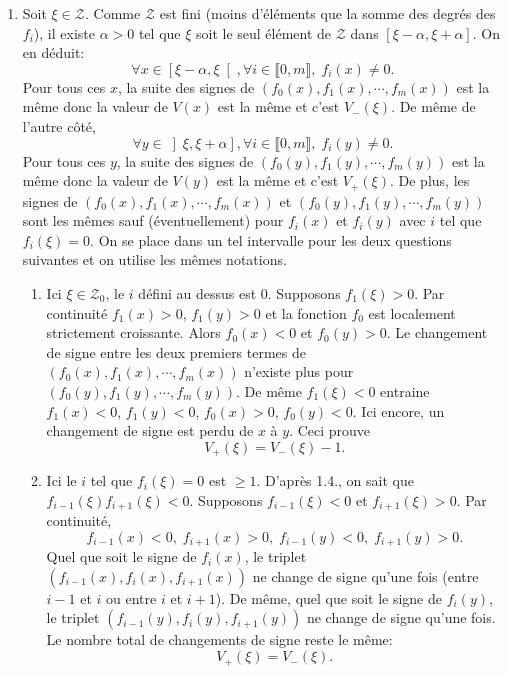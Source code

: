 \begin{enumerate}
  \item Soit $\xi \in \mathcal{Z}$. Comme $\mathcal{Z}$ est fini (moins d'éléments que la somme des degrés des $f_i$), il existe $\alpha > 0$ tel que $\xi$ soit le seul élément de $\mathcal{Z}$ dans $\left[ \xi - \alpha, \xi + \alpha \right]$. On en déduit:
  \[
    \forall x \in \left[ \xi - \alpha, \xi \right[, \forall i \in \llbracket 0, m \rrbracket, \; f_i(x) \neq 0.
  \]
Pour tous ces $x$, la suite des signes de $(f_0(x), f_1(x), \cdots, f_m(x))$ est la même donc la valeur de $V(x)$ est la même et c'est $V_-(\xi)$. De même de l'autre côté,
  \[
    \forall y \in \left] \xi , \xi + \alpha\right], \forall i \in \llbracket 0, m \rrbracket, \; f_i(y) \neq 0.
  \]
Pour tous ces $y$, la suite des signes de $(f_0(y), f_1(y), \cdots, f_m(y))$ est la même donc la valeur de $V(y)$ est la même et c'est $V_+(\xi)$.\newline
De plus, les signes de $(f_0(x), f_1(x), \cdots, f_m(x))$ et $(f_0(y), f_1(y), \cdots, f_m(y))$ sont les mêmes sauf (éventuellement) pour $f_i(x)$ et $f_i(y)$ avec $i$ tel que $f_i(\xi)= 0$.\newline
On se place dans un tel intervalle pour les deux questions suivantes et on utilise les mêmes notations.
  \begin{enumerate}
  \item Ici $\xi \in \mathcal{Z}_0$, le $i$ défini au dessus est $0$.\newline
  Supposons $f_1(\xi) > 0$. Par continuité $f_1(x)>0$, $f_1(y) >0$ et la fonction $f_0$ est localement strictement croissante. Alors $f_0(x) < 0$ et $f_0(y) >0$. Le changement de signe entre les deux premiers termes de $(f_0(x), f_1(x), \cdots, f_m(x))$ n'existe plus pour $(f_0(y), f_1(y), \cdots, f_m(y))$.\newline
  De même $f_1(\xi)<0$ entraine $f_1(x) < 0$, $f_1(y) < 0$, $f_0(x) > 0$, $f_0(y)< 0$. Ici encore, un changement de signe est perdu de $x$ à $y$. Ceci prouve
\[
  V_+(\xi) = V_-(\xi) - 1.
\]

  \item Ici le $i$ tel que $f_i(\xi) = 0$ est $\geq 1$. D'après 1.4., on sait que $f_{i-1}(\xi)f_{i+1}(\xi) < 0$.\newline
Supposons $f_{i-1}(\xi) < 0$ et $f_{i+1}(\xi) > 0$. Par continuité, 
\[
  f_{i-1}(x) < 0,\; f_{i+1}(x) > 0,\; f_{i-1}(y) < 0,\; f_{i+1}(y) > 0 .
\]
Quel que soit le signe de $f_i(x)$, le triplet $(f_{i-1}(x), f_i(x), f_{i+1}(x))$ ne change de signe qu'une fois (entre $i-1$ et $i$ ou entre $i$ et $i+1$). De même, quel que soit le signe de $f_i(y)$, le triplet $(f_{i-1}(y), f_i(y), f_{i+1}(y))$ ne change de signe qu'une fois. Le nombre total de changements de signe reste le même:
\[
  V_+(\xi) = V_-(\xi).
\]


\end{enumerate}
\end{enumerate}
